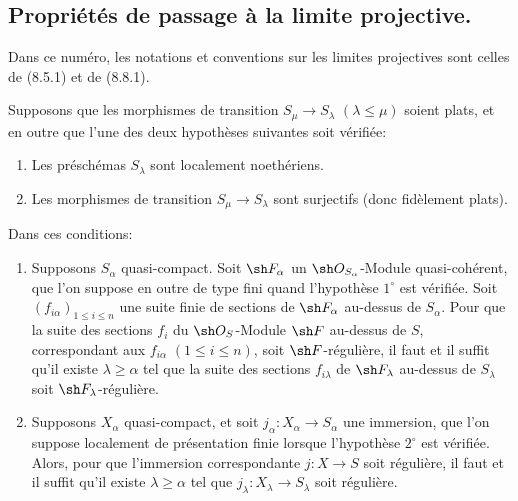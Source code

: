 \subsection{Propriétés de passage à la limite projective.}
\label{IV.19.8}

Dans ce numéro, les notations et conventions sur les limites projectives sont celles de (8.5.1) et de (8.8.1).

\begin{proposition}[19.8.1]
\label{IV.19.8.1}
Supposons que les morphismes de transition $S_\mu\to S_\lambda$ $(\lambda\leq\mu)$ soient plats, et en outre que \textup{l'une} des deux hypothèses suivantes soit vérifiée:
\begin{enumerate}
  \item[$1^\circ$] Les préschémas $S_\lambda$ sont localement noethériens.
  \item[$2^\circ$] Les morphismes de transition $S_\mu\to S_\lambda$ sont surjectifs (donc fidèlement plats).
\end{enumerate}


Dans ces conditions:
\begin{enumerate}
  \item[\textup{(i)}] Supposons $S_\alpha$ quasi-compact. Soit $\sh F_\alpha$ un $\sh O_{S_\alpha}$-Module quasi-cohérent, que l'on suppose en outre de type fini quand l'hypothèse $1^\circ$ est vérifiée. Soit $(f_{i\alpha})_{1\leq i\leq n}$ une suite finie de sections de $\sh F_\alpha$ au-dessus de $S_\alpha$. Pour que la suite des sections $f_i$ du $\sh O_S$-Module $\sh F$ au-dessus de $S$, correspondant aux $f_{i\alpha}$ $(1\leq i\leq n)$, soit $\sh F$-régulière, il faut et il suffit qu'il existe $\lambda\geq\alpha$ tel que la suite des sections $f_{i\lambda}$ de $\sh F_\lambda$ au-dessus de $S_\lambda$ soit $\sh F_\lambda$-régulière.
  \item[\textup{(ii)}] Supposons $X_\alpha$ quasi-compact, et soit $j_\alpha:X_\alpha\to S_\alpha$ une immersion, que l'on suppose localement de présentation finie lorsque l'hypothèse $2^\circ$ est vérifiée. Alors, pour que l'immersion correspondante $j:X\to S$ soit régulière, il faut et il suffit qu'il existe $\lambda\geq\alpha$ tel que $j_\lambda:X_\lambda\to S_\lambda$ soit régulière.
\end{enumerate}
\end{proposition}

